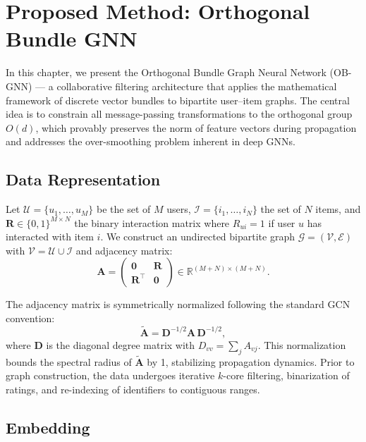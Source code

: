 \section{Proposed Method: Orthogonal Bundle GNN}

In this chapter, we present the Orthogonal Bundle Graph Neural Network (OB-GNN) --- a collaborative filtering architecture that applies the mathematical framework of discrete vector bundles to bipartite user--item graphs. The central idea is to constrain all message-passing transformations to the orthogonal group $O(d)$, which provably preserves the norm of feature vectors during propagation and addresses the over-smoothing problem inherent in deep GNNs.


\subsection{Data Representation}

Let $\mathcal{U} = \{u_1, \ldots, u_M\}$ be the set of $M$ users, $\mathcal{I} = \{i_1, \ldots, i_N\}$ the set of $N$ items, and $\mathbf{R} \in \{0,1\}^{M \times N}$ the binary interaction matrix where $R_{ui} = 1$ if user $u$ has interacted with item $i$. We construct an undirected bipartite graph $\mathcal{G} = (\mathcal{V}, \mathcal{E})$ with $\mathcal{V} = \mathcal{U} \cup \mathcal{I}$ and adjacency matrix:
\begin{equation}
    \mathbf{A} = \begin{pmatrix} \mathbf{0} & \mathbf{R} \\ \mathbf{R}^\top & \mathbf{0} \end{pmatrix} \in \mathbb{R}^{(M+N) \times (M+N)}.
\end{equation}

The adjacency matrix is symmetrically normalized following the standard GCN convention:
\begin{equation}
    \tilde{\mathbf{A}} = \mathbf{D}^{-1/2} \mathbf{A} \, \mathbf{D}^{-1/2},
\end{equation}
where $\mathbf{D}$ is the diagonal degree matrix with $D_{vv} = \sum_j A_{vj}$. This normalization bounds the spectral radius of $\tilde{\mathbf{A}}$ by 1, stabilizing propagation dynamics. Prior to graph construction, the data undergoes iterative $k$-core filtering, binarization of ratings, and re-indexing of identifiers to contiguous ranges.


\subsection{Embedding}

